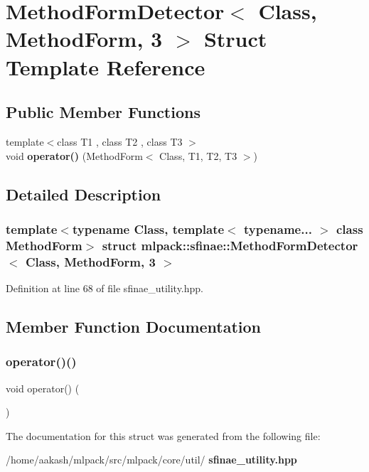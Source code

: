 \section{Method\+Form\+Detector$<$ Class, Method\+Form, 3 $>$ Struct Template Reference}
\label{structmlpack_1_1sfinae_1_1MethodFormDetector_3_01Class_00_01MethodForm_00_013_01_4}
\subsection*{Public Member Functions}
\begin{DoxyCompactItemize}
\item 
{\footnotesize template$<$class T1 , class T2 , class T3 $>$ }\\void \textbf{ operator()} (Method\+Form$<$ Class, T1, T2, T3 $>$)
\end{DoxyCompactItemize}


\subsection{Detailed Description}
\subsubsection*{template$<$typename Class, template$<$ typename... $>$ class Method\+Form$>$\newline
struct mlpack\+::sfinae\+::\+Method\+Form\+Detector$<$ Class, Method\+Form, 3 $>$}



Definition at line 68 of file sfinae\+\_\+utility.\+hpp.



\subsection{Member Function Documentation}
\mbox{\label{structmlpack_1_1sfinae_1_1MethodFormDetector_3_01Class_00_01MethodForm_00_013_01_4_a9232854f75da42612a11d82951f0c3e0}} 
\subsubsection{operator()()}
{\footnotesize\ttfamily void operator() (\begin{DoxyParamCaption}\item[{Method\+Form$<$ Class, T1, T2, T3 $>$}]{ }\end{DoxyParamCaption})}



The documentation for this struct was generated from the following file\+:\begin{DoxyCompactItemize}
\item 
/home/aakash/mlpack/src/mlpack/core/util/\textbf{ sfinae\+\_\+utility.\+hpp}\end{DoxyCompactItemize}
